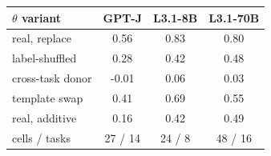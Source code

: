 \begin{tabular}{lccc}
\toprule \textbf{$\theta$ variant} & \textbf{GPT-J} & \textbf{L3.1-8B} & \textbf{L3.1-70B} \\
\midrule
real, replace & 0.56 & 0.83 & 0.80 \\
label-shuffled & 0.28 & 0.42 & 0.48 \\
cross-task donor & -0.01 & 0.06 & 0.03 \\
template swap & 0.41 & 0.69 & 0.55 \\
real, additive & 0.16 & 0.42 & 0.49 \\
\midrule cells / tasks & 27 / 14 & 24 / 8 & 48 / 16 \\
\bottomrule \end{tabular}
